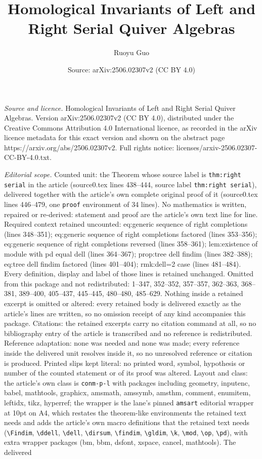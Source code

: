 \documentclass[10pt,a4paper]{amsart}
\title[Homological Invariants of Left and Right Serial Quiver Algeb]{Homological Invariants of Left and Right Serial Quiver Algebras}
\author{Ruoyu Guo}
\date{Source: arXiv:2506.02307v2 (CC BY 4.0)}
\begin{document}
\maketitle

\noindent\emph{Source and licence.} Homological Invariants of Left and Right Serial Quiver Algebras. Version arXiv:2506.02307v2 (CC BY 4.0), distributed under the Creative Commons Attribution 4.0 International licence, as recorded in the arXiv licence metadata for this exact version and shown on the abstract page https://arxiv.org/abs/2506.02307v2. Full rights notice: licenses/arxiv-2506.02307-CC-BY-4.0.txt.\par\smallskip

\noindent\textit{Editorial scope.} Counted unit: the Theorem whose source label is \texttt{thm:right serial} in the article (source0.tex lines 438--444, source label \texttt{thm:right serial}), delivered together with the article's own complete original proof of it (source0.tex lines 446--479, one \texttt{proof} environment of 34 lines). No mathematics is written, repaired or re-derived: statement and proof are the article's own text line for line. Required context retained uncounted: eq:generic sequence of right completions (lines 348--351); eq:generic sequence of right completions factored (lines 353--356); eq:generic sequence of right completions reversed (lines 358--361); lem:existence of module with pd equal dell (lines 364--367); prop:tree dell findim (lines 382--388); eq:tree dell findim factored (lines 401--404); rmk:dell=2 case (lines 481--484). Every definition, display and label of those lines is retained unchanged. Omitted from this package and not redistributed: 1--347, 352--352, 357--357, 362--363, 368--381, 389--400, 405--437, 445--445, 480--480, 485--629. Nothing inside a retained excerpt is omitted or altered: every retained body is delivered exactly as the article's lines are written, so no omission receipt of any kind accompanies this package. Citations: the retained excerpts carry no citation command at all, so no bibliography entry of the article is transcribed and no reference is redistributed. Reference adaptation: none was needed and none was made; every reference inside the delivered unit resolves inside it, so no unresolved reference or citation is produced. Printed slips kept literal: no printed word, symbol, hypothesis or number of the counted statement or of its proof was altered. Layout and class: the article's own class is \texttt{conm-p-l} with packages including geometry, inputenc, babel, mathtools, graphicx, amsmath, amssymb, amsthm, comment, enumitem, leftidx, tikz, hyperref; the wrapper is the lane's pinned \texttt{amsart} editorial wrapper at 10pt on A4, which restates the theorem-like environments the retained text needs and adds the article's own macro definitions that the retained text needs (\texttt{\textbackslash Findim}, \texttt{\textbackslash ddell}, \texttt{\textbackslash dell}, \texttt{\textbackslash dirsum}, \texttt{\textbackslash findim}, \texttt{\textbackslash gldim}, \texttt{\textbackslash k}, \texttt{\textbackslash mod}, \texttt{\textbackslash op}, \texttt{\textbackslash pd}), with extra wrapper packages (bm, bbm, dsfont, xspace, cancel, mathtools). The delivered 
\end{document}
